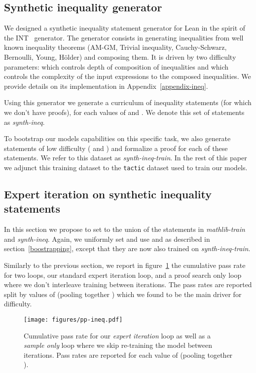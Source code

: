 \documentclass[nohyperref]{article}
\theoremstyle{plain}
\theoremstyle{definition}
\theoremstyle{remark}
\begin{document}
\subsection{Synthetic inequality generator}

We designed a synthetic inequality statement generator for Lean in the spirit of the INT~\cite{wu2020int} generator. The generator consists in generating inequalities from well known inequality theorems (AM-GM, Trivial inequality, Cauchy-Schwarz, Bernoulli, Young, Hölder) and composing them. It is driven by two difficulty parameters:  which controls depth of composition of inequalities and  which controls the complexity of the input expressions to the composed inequalities. We provide details on its implementation in Appendix~\ref{appendix-ineq}.

Using this generator we generate a curriculum of  inequality statements (for which we don't have proofs),  for each values of  and . We denote this set of statements as \textit{synth-ineq}.

To bootstrap our models capabilities on this specific task, we also generate  statements of low difficulty ( and ) and formalize a proof for each of these statements. We refer to this dataset as \textit{synth-ineq-train}. In the rest of this paper we adjunct this training dataset to the \texttt{tactic} dataset used to train our models.

\subsection{Expert iteration on synthetic inequality statements}

In this section we propose to set  to the union of the statements in \textit{mathlib-train} and \textit{synth-ineq}. Again, we uniformly set  and use  and  as described in section~\ref{boostrapping}, except that they are now also trained on \textit{synth-ineq-train}.

Similarly to the previous section, we report in figure~\ref{fig:pp-ineq} the cumulative pass rate for two loops, our standard expert iteration loop, and a proof search only loop where we don't interleave training between iterations. The pass rates are reported split by values of  (pooling together ) which we found to be the main driver for difficulty.

\begin{figure}[ht]
    \begin{center}
    \centerline{\texttt{[image: figures/pp-ineq.pdf]}}
    \caption{Cumulative pass rate for our \textit{expert iteration} loop as well as a \textit{sample only} loop where we skip re-training the model between iterations. Pass rates are reported for each value of  (pooling together ).}
    \label{fig:pp-ineq}
    \end{center}
\end{figure}
\end{document}
